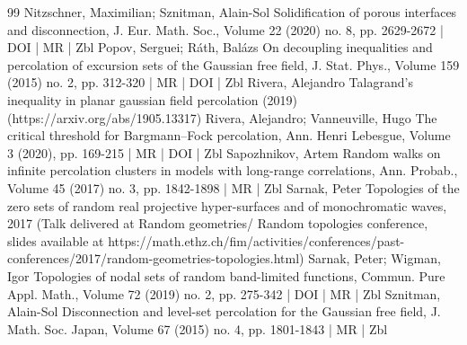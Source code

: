 \documentclass[10pt]{amsart}
\theoremstyle{definition}\newtheorem{defi}[theo]{Definition}\newtheorem{rema}[theo]{Remark}\newtheorem{exam}[theo]{Example}\newtheorem{exem}[theo]{Example}\newtheorem{nota}[theo]{Notation}
\begin{document}
\begin{thebibliography}{99}
Nitzschner, Maximilian; Sznitman, Alain-Sol Solidification of porous interfaces and disconnection, J. Eur. Math. Soc., Volume 22 (2020) no. 8, pp. 2629-2672 | DOI | MR | Zbl
Popov, Serguei; Ráth, Balázs On decoupling inequalities and percolation of excursion sets of the Gaussian free field, J. Stat. Phys., Volume 159 (2015) no. 2, pp. 312-320 | MR | DOI | Zbl
Rivera, Alejandro Talagrand’s inequality in planar gaussian field percolation (2019) (https://arxiv.org/abs/1905.13317)
Rivera, Alejandro; Vanneuville, Hugo The critical threshold for Bargmann–Fock percolation, Ann. Henri Lebesgue, Volume 3 (2020), pp. 169-215 | MR | DOI | Zbl
Sapozhnikov, Artem Random walks on infinite percolation clusters in models with long-range correlations, Ann. Probab., Volume 45 (2017) no. 3, pp. 1842-1898 | MR | Zbl
Sarnak, Peter Topologies of the zero sets of random real projective hyper-surfaces and of monochromatic waves, 2017 (Talk delivered at Random geometries/ Random topologies conference, slides available at https://math.ethz.ch/fim/activities/conferences/past-conferences/2017/random-geometries-topologies.html)
Sarnak, Peter; Wigman, Igor Topologies of nodal sets of random band-limited functions, Commun. Pure Appl. Math., Volume 72 (2019) no. 2, pp. 275-342 | DOI | MR | Zbl
Sznitman, Alain-Sol Disconnection and level-set percolation for the Gaussian free field, J. Math. Soc. Japan, Volume 67 (2015) no. 4, pp. 1801-1843 | MR | Zbl
\end{thebibliography}
\end{document}
